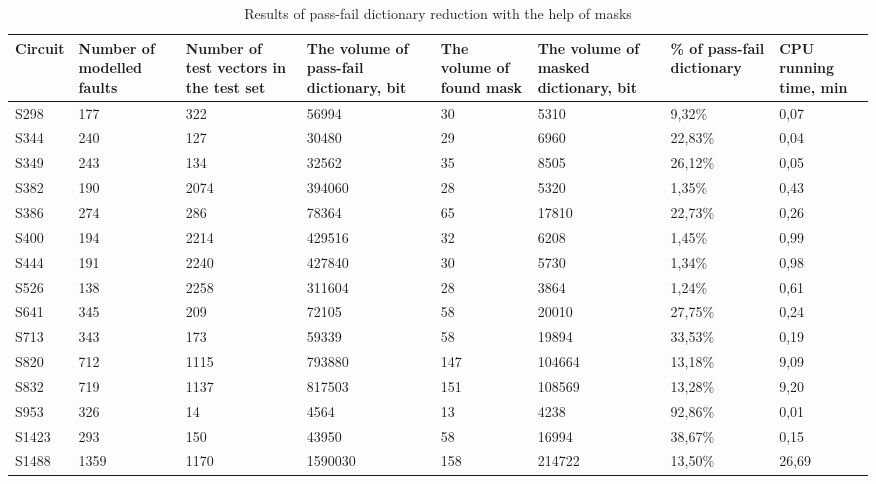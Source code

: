 \documentclass[bachelor, och, coursework, times]{SCWorks}
\begin{document}
\begin{table}[!ht]
	\footnotesize
	\caption{Results of pass-fail dictionary reduction with the help
	of masks} \label{table-2}
	\begin{tabular}{|p{1.5cm}|
	                 p{1.5cm}|
	                 p{1.5cm}|
	                 p{1.5cm}|
	                 p{1cm}|
	                 p{1.5cm}|
	                 p{1.5cm}|
	                 p{1cm}|}
		\hline \centering Circuit & Number of modelled faults & Number of test
		vectors in the test set & The volume of pass-fail dictionary,
		\linebreak bit & The volume of found mask & The volume of
		masked dictionary, \linebreak bit & \raggedright \% of pass-fail dictionary
		& CPU running time, \linebreak min
		\\
		\hline S298 & 177 & 322 & 56994 & 30 & 5310 & 9,32\% & 0,07\\
		\hline S344 & 240 & 127 & 30480 & 29 & 6960 & 22,83\% & 0,04\\
		\hline S349 & 243 & 134 & 32562 & 35 & 8505 & 26,12\% & 0,05\\
		\hline S382 & 190 & 2074 & 394060 & 28 & 5320 & 1,35\% & 0,43\\
		\hline S386 & 274 & 286 & 78364 & 65 & 17810 & 22,73\% & 0,26\\
		\hline S400 & 194 & 2214 & 429516 & 32 & 6208 & 1,45\% & 0,99\\
		\hline S444 & 191 & 2240 & 427840 & 30 & 5730 & 1,34\% & 0,98\\
		\hline S526 & 138 & 2258 & 311604 & 28 & 3864 & 1,24\% & 0,61\\
		\hline S641 & 345 & 209 & 72105 & 58 & 20010 & 27,75\% & 0,24\\
		\hline S713 & 343 & 173 & 59339 & 58 & 19894 & 33,53\% & 0,19\\
		\hline S820 & 712 & 1115 & 793880 & 147 & 104664 & 13,18\% & 9,09\\
		\hline S832 & 719 & 1137 & 817503 & 151 & 108569 & 13,28\% & 9,20\\
		\hline S953 & 326 & 14 & 4564 & 13 & 4238 & 92,86\% & 0,01\\
		\hline S1423 & 293 & 150 & 43950 & 58 & 16994 & 38,67\% & 0,15\\
		\hline S1488 & 1359 & 1170 & 1590030 & 158 & 214722 & 13,50\% & 26,69\\
		\hline
	\end{tabular}
\end{table}
\end{document}
